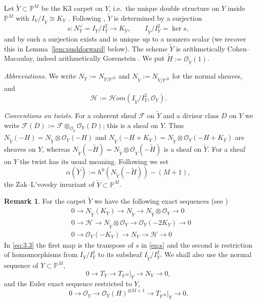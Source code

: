 \documentclass[11pt,twoside]{amsart}
\theoremstyle{plain}
\theoremstyle{definition}
\newtheorem{remark}[theorem]{Remark}
\newcommand{\PM}{\mathbb{P}^M}
\newcommand{\OO}{\mathcal{O}}
\newcommand{\sHom}{\mathcal{H}om}
\newcommand{\Yt}{\widetilde{Y}}
\newcommand{\Ht}{\widetilde{H}}
\newcommand{\NY}{N_{Y}}
\newcommand{\NYt}{N_{\Yt}}
\newcommand{\Hc}{\mathcal{H}}
\newcommand{\TP}{T_{\PM}|_Y}
\newcommand{\Dd}{D}
\begin{document}
Let $\Yt\subset\PM$ be the K3 carpet on $Y$, i.e.\ the unique double structure on $Y$ inside $\PM$ with $I_Y/I_{\Yt}\cong K_Y$ \cite[Proposition~1.7]{GP97}. Following \cite{BE95}, $\Yt$ is determined by a surjection
\begin{equation}\label{eq:s}
s\colon \NY^{\vee}=I_Y/I_Y^2\longrightarrow K_Y ,\qquad I_{\Yt}/I_Y^2=\ker s ,
\end{equation}
and by \cite[Proposition~1.7]{GP97} such a surjection exists and is unique up to a nonzero scalar (we recover this in Lemma~\ref{lem:pushforward} below). The scheme $\Yt$ is arithmetically Cohen--Macaulay, indeed arithmetically Gorenstein \cite[Theorem~3.2]{ES18}. We put $\Ht:=\OO_{\Yt}(1)$.

\emph{Abbreviations.} We write $\NY:=N_{Y/\PM}$ and $\NYt:=N_{\Yt/\PM}$ for the normal sheaves, and
\[
\Hc:=\sHom(I_{\Yt}/I_Y^2,\OO_Y).
\]

\emph{Conventions on twists.} For a coherent sheaf $\mathcal{F}$ on $\Yt$ and a divisor class $\Dd$ on $Y$ we write $\mathcal{F}(\Dd):=\mathcal{F}\otimes_{\OO_{\Yt}}\OO_Y(\Dd)$; this is a sheaf on $Y$. Thus $\NYt(-H)=\NYt\otimes\OO_Y(-H)$ and $\NYt(-H+K_Y)=\NYt\otimes\OO_Y(-H+K_Y)$ are sheaves on $Y$, whereas $\NYt(-\Ht)=\NYt\otimes\OO_{\Yt}(-\Ht)$ is a sheaf on $\Yt$. For a sheaf on $Y$ the twist has its usual meaning. Following \cite{BM24} we set
\[
\alpha(\Yt):=h^0(\NYt(-\Ht))-(M+1),
\]
the Zak--L'vovsky invariant of $\Yt\subset\PM$.

\begin{remark}\label{rem:sequences}
For the carpet $\Yt$ we have the following exact sequences (see \cite[Lemma~4.1]{GGP08})
\begin{align}
&0\to \NYt(K_Y)\to \NYt\to \NYt\otimes\OO_Y\to 0 \label{eq:3.1}\\
&0\to \Hc\to \NYt\otimes\OO_Y\to \OO_Y(-2K_Y)\to 0 \label{eq:3.2}\\
&0\to \OO_Y(-K_Y)\to \NY\to \Hc\to 0 \label{eq:3.3}
\end{align}
In \eqref{eq:3.3} the first map is the transpose of $s$ in \eqref{eq:s} and the second is restriction of homomorphisms from $I_Y/I_Y^2$ to its subsheaf $I_{\Yt}/I_Y^2$. We shall also use the normal sequence of $Y\subset\PM$,
\begin{equation}\label{eq:3.10}
0\to T_Y\to \TP\to \NY\to 0,
\end{equation}
and the Euler exact sequence restricted to $Y$,
\begin{equation}\label{eq:3.11}
0\to \OO_Y\to \OO_Y(H)^{\oplus M+1}\to \TP\to 0 .
\end{equation}
\end{remark}
\end{document}
